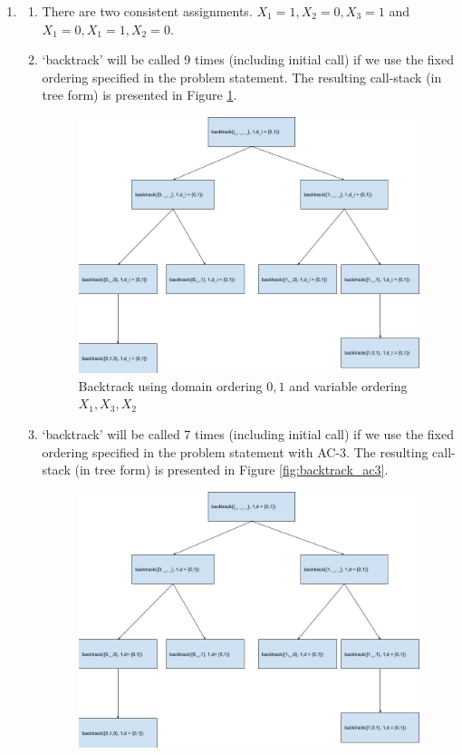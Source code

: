 \documentclass[12pt]{article}
\begin{document}
\begin{enumerate}[label=(\alph*)]
  \item
    \begin{enumerate}[label=\roman*]
      \item There are two consistent assignments. $X_1 = 1, X_2 = 0, X_3 = 1$ and $X_1 = 0, X_1 = 1, X_2 = 0$.
      \item `backtrack' will be called 9 times (including initial call) if we use the fixed ordering specified in the problem statement. The resulting call-stack (in tree form) is presented in Figure \ref{fig:backtrack_simple}.
        \begin{figure}[!h]
          \centering
          \includegraphics[scale=0.3]{backtrack.jpg}
          \caption{Backtrack using domain ordering ${0,1}$ and variable ordering ${X_1, X_3, X_2}$}
          \label{fig:backtrack_simple}
        \end{figure}
      \item `backtrack' will be called 7 times (including initial call) if we use the fixed ordering specified in the problem statement with AC-3. The resulting call-stack (in tree form) is presented in Figure \ref{fig:backtrack_ac3}.
       \begin{figure}[!h]
          \centering
          \includegraphics[scale=0.3]{backtrack_ac3.jpg}

\end{figure}
\end{enumerate}
\end{enumerate}
\end{document}
